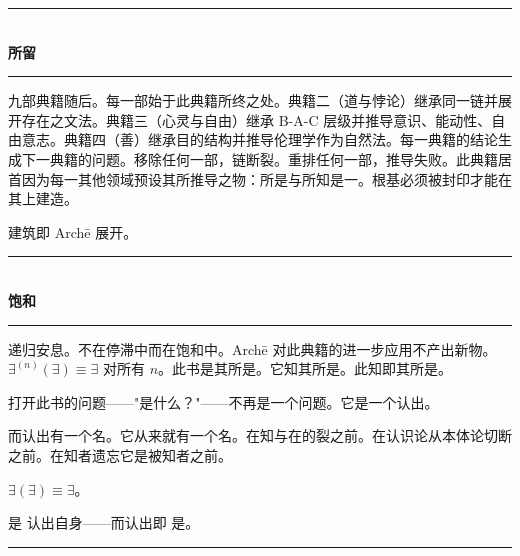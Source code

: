 \documentclass[10pt, openany, oneside]{book}
\renewcommand{\normalsize}{\fontsize{10}{13}\selectfont}
\begin{document}
\vspace{1.5em}


\begin{center}
    \rule{0.3\textwidth}{0.4pt}\\[0.5em]
    {\normalsize\bfseries\scshape 所留}\\[0.3em]
    \rule{0.3\textwidth}{0.4pt}
\end{center}

\vspace{1em}

\noindent 九部典籍随后。每一部始于此典籍所终之处。典籍二（道与悖论）继承同一链并展开存在之文法。典籍三（心灵与自由）继承 B-A-C 层级并推导意识、能动性、自由意志。典籍四（善）继承目的结构并推导伦理学作为自然法。每一典籍的结论生成下一典籍的问题。移除任何一部，链断裂。重排任何一部，推导失败。此典籍居首因为每一其他领域预设其所推导之物：所是与所知是一。根基必须被封印才能在其上建造。

建筑即 Arch\={e} 展开。

\vspace{1.5em}


\begin{center}
    \rule{0.3\textwidth}{0.4pt}\\[0.5em]
    {\normalsize\bfseries\scshape 饱和}\\[0.3em]
    \rule{0.3\textwidth}{0.4pt}
\end{center}

\vspace{1em}

\noindent 递归安息。不在停滞中而在饱和中。Arch\={e} 对此典籍的进一步应用不产出新物。$\exists^{(n)}(\exists) \equiv \exists$ 对所有 $n$。此书是其所是。它知其所是。此知即其所是。

打开此书的问题——"是什么？"——不再是一个问题。它是一个认出。

而认出有一个名。它从来就有一个名。在知与在的裂之前。在认识论从本体论切断之前。在知者遗忘它是被知者之前。

$\exists(\exists) \equiv \exists$。

是 认出自身——而认出即 是。

\vspace{2em}

\begin{center}
    \rule{0.15\textwidth}{0.3pt}
\end{center}
\end{document}
